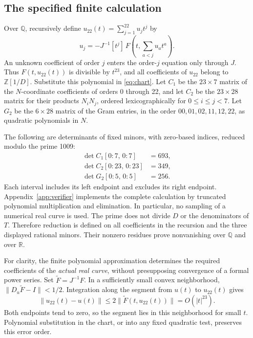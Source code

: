 \documentclass[11pt]{article}
\newcommand{\R}{\mathbb R}
\newcommand{\Q}{\mathbb Q}
\newcommand{\Z}{\mathbb Z}
\begin{document}
\subsection{The specified finite calculation}
Over $\Q$, recursively define
$u_{22}(t)=\sum_{j=1}^{22}u_jt^j$ by
\begin{equation}\label{eq:recursion}
 u_j=-J^{-1}[t^j]\,F\!\left(t,\sum_{a<j}u_at^a\right).
\end{equation}
An unknown coefficient of order $j$ enters the order-$j$ equation only
through $J$. Thus $F(t,u_{22}(t))$ is divisible by $t^{23}$, and all
coefficients of $u_{22}$ belong to $\Z[1/D]$.
Substitute this polynomial in \eqref{eq:chart}. Let $C_1$ be the
$23\times7$ matrix of the $N$-coordinate coefficients of orders 0 through
22, and let $C_2$ be the $23\times28$ matrix for their products $N_iN_j$,
ordered lexicographically for $0\leq i\leq j<7$.
Let $G_2$ be the $6\times28$ matrix of the Gram entries, in the order
$00,01,02,11,12,22$, as quadratic polynomials in $N$.

The following are determinants of fixed minors, with zero-based indices,
reduced modulo the prime 1009:
\begin{align}
 \det C_1[0\!:\!7,\,0\!:\!7]&=693,\label{eq:c1}\\
 \det C_2[0\!:\!23,\,0\!:\!23]&=349,\label{eq:c2}\\
 \det G_2[0\!:\!5,\,0\!:\!5]&=256.\label{eq:g2}
\end{align}
Each interval includes its left endpoint and excludes its right endpoint.
Appendix~\ref{app:verifier} implements the complete calculation by
truncated polynomial multiplication and elimination. In particular, no
sampling of a numerical real curve is used. The prime does not divide $D$
or the denominators of $T$. Therefore reduction is defined on all
coefficients in the recursion and the three displayed rational minors.
Their nonzero residues prove nonvanishing over $\Q$ and over $\R$.

For clarity, the finite polynomial approximation determines the required
coefficients of the \emph{actual real curve}, without presupposing convergence
of a formal power series. Set $\widetilde F=J^{-1}F$. In a sufficiently
small convex neighborhood,
$\|D_u\widetilde F-I\|<1/2$. Integration along the segment from
$u(t)$ to $u_{22}(t)$ gives
\begin{equation}\label{eq:error}
 \|u_{22}(t)-u(t)\|
 \leq2\|\widetilde F(t,u_{22}(t))\|=O(|t|^{23}).
\end{equation}
Both endpoints tend to zero, so the segment lies in this neighborhood
for small $t$. Polynomial substitution in the chart, or into any fixed
quadratic test, preserves this error order.
\end{document}

